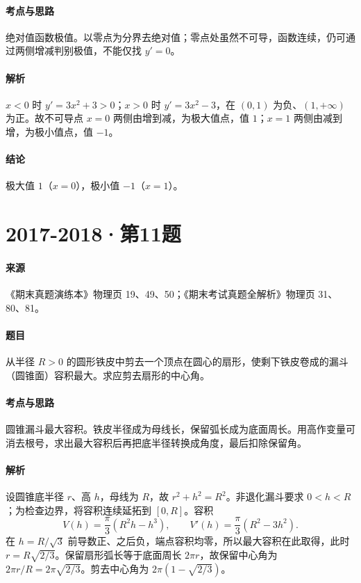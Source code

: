 \documentclass[UTF8,fontset=fandol,12pt,oneside,openany]{ctexrep}
\theoremstyle{definition}
\begin{document}
\paragraph{考点与思路}
绝对值函数极值。以零点为分界去绝对值；零点处虽然不可导，函数连续，仍可通过两侧增减判别极值，不能仅找 $y'=0$。
\paragraph{解析}
$x<0$ 时 $y'=3x^2+3>0$；$x>0$ 时 $y'=3x^2-3$，在 $(0,1)$ 为负、$(1,+\infty)$ 为正。故不可导点 $x=0$ 两侧由增到减，为极大值点，值 $1$；$x=1$ 两侧由减到增，为极小值点，值 $-1$。
\paragraph{结论}
极大值 $1$（$x=0$），极小值 $-1$（$x=1$）。

\par\addvspace{18pt}\noindent\begin{minipage}{\linewidth}
\section{2017-2018·第11题}
\paragraph{来源}《期末真题演练本》物理页 19、49、50；《期末考试真题全解析》物理页 31、80、81。
\paragraph{题目}
从半径 $R>0$ 的圆形铁皮中剪去一个顶点在圆心的扇形，使剩下铁皮卷成的漏斗（圆锥面）容积最大。求应剪去扇形的中心角。
\end{minipage}\par
\paragraph{考点与思路}
圆锥漏斗最大容积。铁皮半径成为母线长，保留弧长成为底面周长。用高作变量可消去根号，求出最大容积后再把底半径转换成角度，最后扣除保留角。
\paragraph{解析}
设圆锥底半径 $r$、高 $h$，母线为 $R$，故 $r^2+h^2=R^2$。非退化漏斗要求 $0<h<R$；为检查边界，将容积连续延拓到 $[0,R]$。容积
\[V(h)=\frac\pi3(R^2h-h^3),\qquad V'(h)=\frac\pi3(R^2-3h^2).\]
在 $h=R/\sqrt3$ 前导数正、之后负，端点容积均零，所以最大容积在此取得，此时 $r=R\sqrt{2/3}$。保留扇形弧长等于底面周长 $2\pi r$，故保留中心角为 $2\pi r/R=2\pi\sqrt{2/3}$。剪去中心角为 $2\pi(1-\sqrt{2/3})$。
\end{document}

